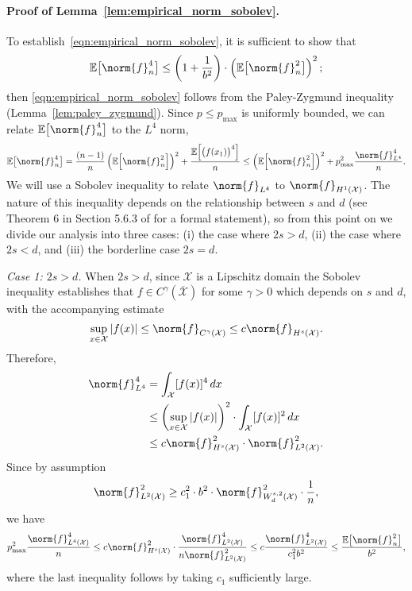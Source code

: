 \documentclass[twoside]{article}
\newcommand{\abs}[1]{\left \lvert #1 \right \rvert}
\newcommand{\1}{\mathbf{1}}
\newcommand{\Xset}{\mathcal{X}}
\newcommand{\Leb}{L}
\newcommand{\Ebb}{\mathbb{E}}
\theoremstyle{definition}
\theoremstyle{remark}
\begin{document}
\paragraph{Proof of Lemma~\ref{lem:empirical_norm_sobolev}.}
To establish~\eqref{eqn:empirical_norm_sobolev}, it is sufficient to show that
\begin{equation*}
\mathbb{E}\bigl[\norm{f}_n^4\bigr] \leq \left(1 + \frac{1}{b^2}\right)\cdot \left(\mathbb{E}\bigl[\norm{f}_n^2\bigr]\right)^2;
\end{equation*}
then \eqref{eqn:empirical_norm_sobolev} follows from the Paley-Zygmund inequality (Lemma~\ref{lem:paley_zygmund}). Since $p \leq p_{\max}$ is uniformly bounded, we can relate $\mathbb{E}\bigl[\norm{f}_n^4\bigr]$ to the $\Leb^4$ norm,
\begin{equation*}
\mathbb{E}\bigl[\norm{f}_n^4\bigr] = \frac{(n-1)}{n}\left(\mathbb{E}\Bigl[\norm{f}_n^2\Bigr]\right)^2 + \frac{\mathbb{E}\Bigl[\bigl(f(x_1)\bigr)^4\Bigr]}{n} \leq \left(\mathbb{E}\Bigl[\norm{f}_n^2\Bigr]\right)^2 + p_{\max}^2\frac{\norm{f}_{\Leb^4}^4}{n}.
\end{equation*}
We will use a Sobolev inequality to relate $\norm{f}_{\Leb^4}$ to $\norm{f}_{H^1(\Xset)}$. The nature of this inequality depends on the relationship between $s$ and $d$ (see Theorem 6 in Section 5.6.3 of \cite{evans10} for a formal statement), so from this point on we divide our analysis into three cases: (i) the case where $2s > d$, (ii) the case where $2s < d$, and (iii) the borderline case $2s = d$.

\textit{Case 1: $2s > d$.}
When $2s > d$, since $\Xset$ is a Lipschitz domain the Sobolev inequality establishes that $f \in C^{\gamma}(\overline{\Xset})$ for some $\gamma > 0$ which depends on $s$ and $d$, with the accompanying estimate
\begin{equation*}
\sup_{x \in \Xset} \abs{f(x)} \leq \norm{f}_{C^{\gamma}(\Xset)} \leq c \norm{f}_{H^s(\Xset)}.
\end{equation*}
Therefore,
\begin{align*}
\norm{f}_{\Leb^4}^4 & = \int_{\Xset} [f(x)]^4 \,dx \\
& \leq \left(\sup_{x \in \Xset} \abs{f(x)}\right)^2 \cdot \int_{\Xset} [f(x)]^2 \,dx \\
& \leq c \norm{f}_{H^s(\Xset)}^2 \cdot \norm{f}_{\Leb^2(\Xset)}^2.
\end{align*}
Since by assumption
\begin{equation*}
\norm{f}_{\Leb^2(\Xset)}^2 \geq c_1^2 \cdot b^2 \cdot \norm{f}_{W_d^{s,2}(\Xset)}^2 \cdot \frac{1}{n},
\end{equation*}
we have
\begin{equation*}
p_{\max}^2\frac{\norm{f}_{\Leb^4(\Xset)}^4}{n} \leq c \norm{f}_{H^s(\Xset)}^2 \cdot \frac{\norm{f}_{\Leb^2(\Xset)}^4}{n \norm{f}_{\Leb^2(\Xset)}^2} \leq c \frac{\norm{f}_{\Leb^2(\Xset)}^4}{c_1^2 b^2} \leq \frac{\Ebb\bigl[\norm{f}_n^2\bigr]}{b^2},
\end{equation*}
where the last inequality follows by taking $c_1$ sufficiently large.
\end{document}
